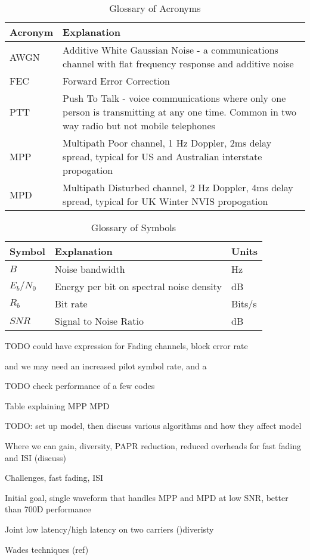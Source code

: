 \documentclass{article}
\begin{document}
\begin{table}[h]
\centering
\begin{tabular}{l m{8cm} }
 \hline
 Acronym & Explanation \\
 \hline
 AWGN & Additive White Gaussian Noise - a communications channel with flat frequency response and additive noise \\
 FEC & Forward Error Correction \\
 PTT & Push To Talk - voice communications where only one person is transmitting at any one time.  Common in two way radio but not mobile telephones  \\
 MPP & Multipath Poor channel, 1 Hz Doppler, 2ms delay spread, typical for US and Australian interstate propogation \\
 MPD & Multipath Disturbed channel, 2 Hz Doppler, 4ms delay spread, typical for UK Winter NVIS propogation \\
 \hline
\end{tabular}
\caption{Glossary of Acronyms}
\end{table}

\begin{table}[h]
\centering
\begin{tabular}{l l l}
 \hline
 Symbol & Explanation & Units \\
 \hline
 $B$ & Noise bandwidth & Hz \\
 $E_b/N_0$ &  Energy per bit on spectral noise density & dB \\
 $R_b$ & Bit rate & Bits/s \\
 $SNR$ & Signal to Noise Ratio & dB \\
 \hline
\end{tabular}
\caption{Glossary of Symbols}
\end{table}

TODO could have expression for Fading channels, block error rate

 and we may need an increased pilot symbol rate, and a 

TODO check performance of a few codes

Table explaining MPP MPD

TODO: set up model, then discuss various algorithms and how they affect model

Where we can gain, diversity, PAPR reduction, reduced overheads for fast fading and ISI (discuss)

Challenges, fast fading, ISI

Initial goal, single waveform that handles MPP and MPD at low SNR, better than 700D performance

Joint low latency/high latency on two carriers ()diveristy

Wades techniques (ref)



\end{document}
